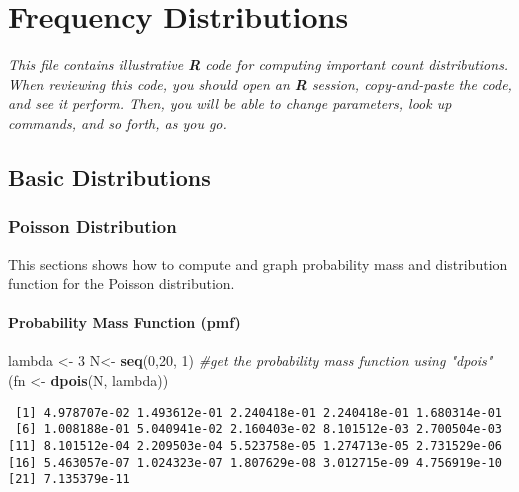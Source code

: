 \documentclass[]{book}
\newenvironment{Shaded}{\begin{snugshade}}{\end{snugshade}}
\newcommand{\KeywordTok}[1]{\textcolor[rgb]{0.13,0.29,0.53}{\textbf{#1}}}
\newcommand{\DecValTok}[1]{\textcolor[rgb]{0.00,0.00,0.81}{#1}}
\newcommand{\StringTok}[1]{\textcolor[rgb]{0.31,0.60,0.02}{#1}}
\newcommand{\CommentTok}[1]{\textcolor[rgb]{0.56,0.35,0.01}{\textit{#1}}}
\newcommand{\NormalTok}[1]{#1}
\theoremstyle{definition}
\theoremstyle{definition}
\theoremstyle{definition}
\theoremstyle{remark}
\begin{document}
\chapter{Frequency Distributions}\label{frequency-distributions}

\emph{This file contains illustrative \textbf{R} code for computing
important count distributions. When reviewing this code, you should open
an \textbf{R} session, copy-and-paste the code, and see it perform.
Then, you will be able to change parameters, look up commands, and so
forth, as you go.}

\section{Basic Distributions}\label{basic-distributions}

\subsection{Poisson Distribution}\label{poisson-distribution}

This sections shows how to compute and graph probability mass and
distribution function for the Poisson distribution.

\subsubsection{Probability Mass Function
(pmf)}\label{probability-mass-function-pmf}

\begin{Shaded}
\begin{Highlighting}[]
\NormalTok{lambda <-}\StringTok{ }\DecValTok{3}
\NormalTok{N<-}\StringTok{ }\KeywordTok{seq}\NormalTok{(}\DecValTok{0}\NormalTok{,}\DecValTok{20}\NormalTok{, }\DecValTok{1}\NormalTok{)}
\CommentTok{#get the probability mass function using "dpois"}
\NormalTok{(fn <-}\StringTok{ }\KeywordTok{dpois}\NormalTok{(N, lambda))}
\end{Highlighting}
\end{Shaded}

\begin{verbatim}
 [1] 4.978707e-02 1.493612e-01 2.240418e-01 2.240418e-01 1.680314e-01
 [6] 1.008188e-01 5.040941e-02 2.160403e-02 8.101512e-03 2.700504e-03
[11] 8.101512e-04 2.209503e-04 5.523758e-05 1.274713e-05 2.731529e-06
[16] 5.463057e-07 1.024323e-07 1.807629e-08 3.012715e-09 4.756919e-10
[21] 7.135379e-11
\end{verbatim}
\end{document}
